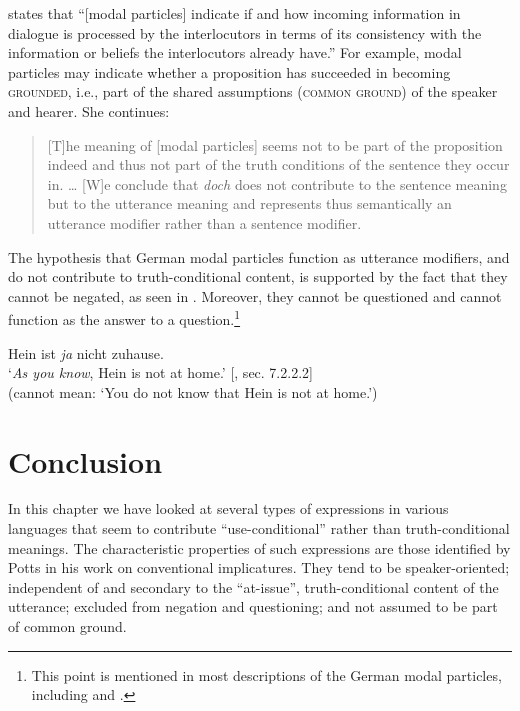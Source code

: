 \citet{Karagjosova2000} states that “[modal particles] indicate if and how incoming information in dialogue is processed by the interlocutors in terms of its consistency with the information or beliefs the interlocutors already have.” For example, modal particles may indicate whether a proposition has succeeded in becoming \textsc{grounded}, i.e., part of the shared assumptions (\textsc{common ground}) of the speaker and hearer. She continues:


\begin{quote}
{}[T]he meaning of [modal particles] seems not to be part of the proposition indeed and thus not part of the truth conditions of the sentence they occur in. …  [W]e conclude that \textit{doch} does not contribute to the sentence meaning but to the utterance meaning and represents thus semantically an utterance modifier rather than a sentence modifier.
\end{quote}


The hypothesis that German modal particles function as utterance modifiers, and do not contribute to truth-conditional content, is supported by the fact that they cannot be negated, as seen in . Moreover, they cannot be questioned and cannot function as the answer to a question.\footnote{This point is mentioned in most descriptions of the German modal particles, including \citet{Bross2012} and \citet{Gutzmann2015}.}


\ea
Hein ist \textit{ja} nicht zuhause.\\
‘\textit{As you know}, Hein is not at home.’  [\citealt{Gutzmann2015}, sec. 7.2.2.2]\\
(cannot mean: ‘You do not know that Hein is not at home.’)
\z

\section{Conclusion}\label{sec:} %

In this chapter we have looked at several types of expressions in various languages that seem to contribute “use-conditional” rather than truth-conditional meanings. The characteristic properties of such expressions are those identified by Potts in his work on conventional implicatures. They tend to be speaker-oriented; independent of and secondary to the “at-issue”, truth-conditional content of the utterance; excluded from negation and questioning; and not assumed to be part of common ground.



